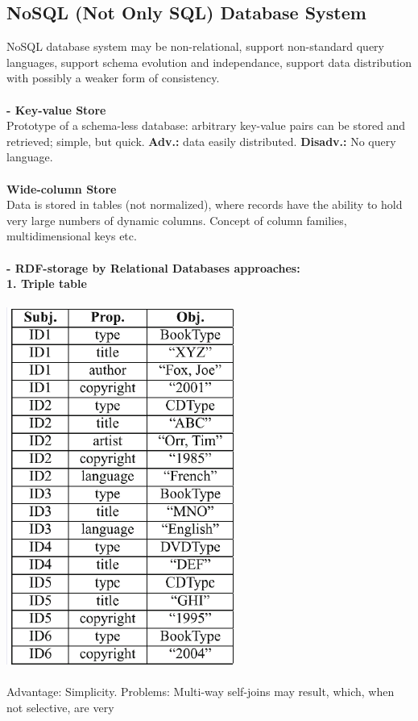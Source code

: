 \documentclass{article}
\begin{document}
\subsection{NoSQL (Not Only SQL) Database System}
NoSQL database system may be non-relational, support non-standard query languages, support schema evolution and independance, support data distribution with possibly a weaker form of consistency.\\\\
\textbf{- Key-value Store} \\
Prototype of a schema-less database: arbitrary key-value pairs can be stored and
retrieved; simple, but quick. \textbf{Adv.: }data easily distributed. \textbf{Disadv.: }No query language.\\\\
\textbf{Wide-column Store}\\
Data is stored in tables (not normalized), where records have the ability to hold very large numbers of dynamic columns. Concept of column families, multidimensional keys etc.\\\\
\textbf{- RDF-storage by Relational Databases approaches:}\\
\textbf{1. Triple table\\\\}
\includegraphics[scale=0.6]{32.png}\\\\
Advantage: Simplicity. Problems: Multi-way self-joins may result, which, when not selective, are very
\end{document}
